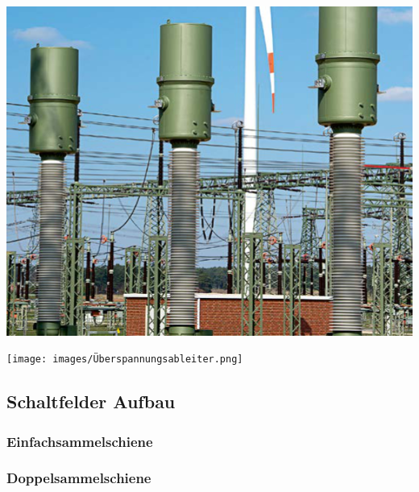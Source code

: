 \begin{minipage}[c]{0.48\columnwidth}
    \begin{center}
        \includegraphics[width=0.98\columnwidth]{images/Messwandler.png}
    \end{center}
\end{minipage}
\hfill
\begin{minipage}[c]{0.48\columnwidth}
    \begin{center}
        \texttt{[image: images/Überspannungsableiter.png]}
    \end{center}
\end{minipage}


\subsection{Schaltfelder Aufbau}

\begin{minipage}[c]{0.48\columnwidth}
    \subsubsection{Einfachsammelschiene}
\end{minipage}
\hfill
\begin{minipage}[c]{0.48\columnwidth}
    \subsubsection{Doppelsammelschiene}
\end{minipage}

